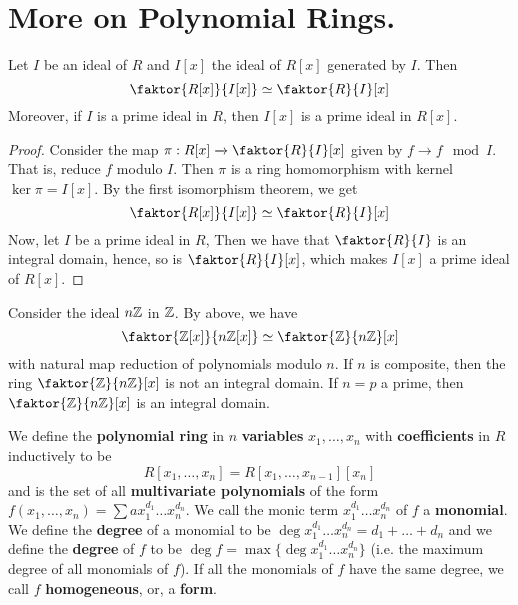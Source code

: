 
\section{More on Polynomial Rings.}

\begin{theorem}\label{3.1.1}
    Let $I$ be an ideal of  $R$ and  $I[x]$ the ideal of $R[x]$ generated by
    $I$. Then
    \begin{equation*}
        \faktor{R[x]}{I[x]} \simeq \faktor{R}{I}[x]
    \end{equation*}
    Moreover, if $I$ is a prime ideal in $R$, then $I[x]$ is a prime ideal in
    $R[x]$.
\end{theorem}
\begin{proof}
    Consider the map $\pi:R[x] \xrightarrow{} \faktor{R}{I}[x]$ given by $f
    \xrightarrow{} f \mod{I}$. That is, reduce $f$ modulo  $I$.  Then $\pi$ is a
    ring homomorphism with kernel $\ker{\pi}=I[x]$. By the first isomorphism
    theorem, we get
    \begin{equation*}
        \faktor{R[x]}{I[x]} \simeq \faktor{R}{I}[x]
    \end{equation*}
    Now, let $I$ be a prime ideal in $R$, Then we have that $\faktor{R}{I}$ is
    an integral domain, hence, so is $\faktor{R}{I}[x]$, which makes $I[x]$ a
    prime ideal of $R[x]$.
\end{proof}

\begin{example}\label{3.1}
    Consider the ideal $n\mathbb{Z}$ in  $\mathbb{Z}$. By above, we have
    \begin{equation*}
        \faktor{\Z[x]}{n\Z[x]} \simeq \faktor{\Z}{n\Z}[x]
    \end{equation*}
    with natural map reduction of polynomials modulo $n$. If $n$ is composite,
    then the ring $\faktor{\Z}{n\Z}[x]$ is not an integral domain. If $n=p$ a
    prime, then  $\faktor{\Z}{n\Z}[x]$ is an integral domain.
\end{example}

\begin{definition}
    We define the \textbf{polynomial ring} in $n$  \textbf{variables} $x_1,
    \dots, x_n$ with \textbf{coefficients} in $R$ inductively to be
    \begin{equation*}
        R[x_1, \dots, x_n]=R[x_1, \dots, x_{n-1}][x_n]
    \end{equation*}
    and is the set of all \textbf{multivariate polynomials} of the form $f(x_1,
    \dots,x_n)=\sum{ax_1^{d_1} \dots x_n^{d_n}}$. We call the monic term
    $x_1^{d_1} \dots x_n^{d_n}$ of $f$ a  \textbf{monomial}. We define the
    \textbf{degree} of a monomial to be $\deg{x_1^{d_1} \dots
    x_n^{d_n}}=d_1+\dots+d_n$ and we define the \textbf{degree} of $f$ to be
    $\deg{f}=\max{\{\deg{x_1^{d_1} \dots x_n^{d_n}}\}}$ (i.e. the maximum degree
    of all monomials of $f$). If all the monomials of $f$ have the same degree,
    we call  $f$  \textbf{homogeneous}, or, a \textbf{form}.
\end{definition}

